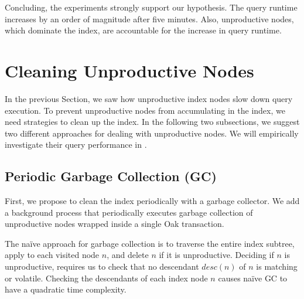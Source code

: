 \documentclass[abstracton,12pt]{scrartcl}
\theoremstyle{definition}
\begin{document}
Concluding, the experiments strongly support our hypothesis. The query runtime
increases by an order of magnitude after five minutes. Also, unproductive
nodes, which dominate the index, are accountable for the increase in query runtime. 

\newpage

\section{Cleaning Unproductive Nodes}

In the previous Section, we saw how unproductive index nodes slow down query
execution. To prevent unproductive nodes from accumulating in the index, we
need strategies to clean up the index. In the following two subsections, we suggest two
different approaches for dealing with unproductive nodes. We will empirically
investigate their query performance in .

\vspace{-0.3cm}

\subsection{Periodic Garbage Collection (GC)}

\label{sec:gc}

First, we propose to clean the index periodically with a garbage collector.
We add a background process that periodically executes
garbage collection of unproductive nodes wrapped inside 
a single Oak transaction.

The naïve approach for garbage collection is to traverse the entire index subtree,
apply  to each visited node $n$, and delete $n$ if it
is unproductive. Deciding if $n$ is unproductive, requires us to check that no
descendant $desc(n)$ of $n$ is matching or volatile. Checking the descendants of
each index node $n$ causes naïve GC to have a quadratic time complexity.
\end{document}
